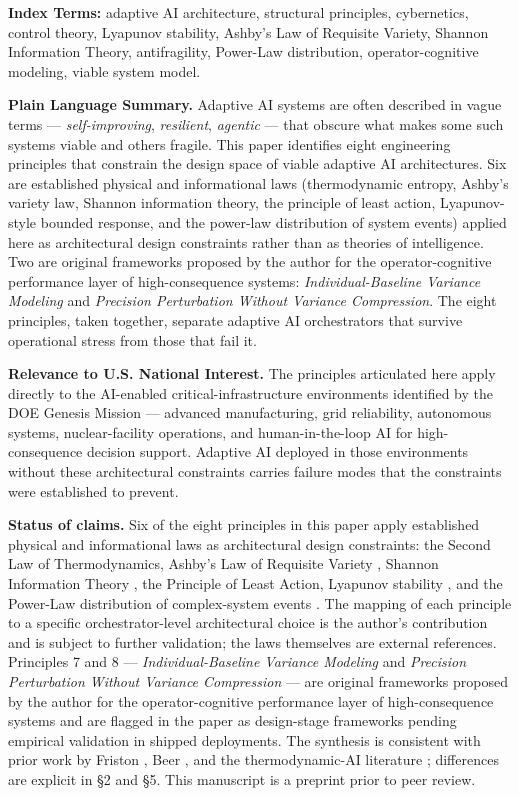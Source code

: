 \textbf{Index Terms:} adaptive AI architecture, structural principles,
cybernetics, control theory, Lyapunov stability, Ashby's Law of
Requisite Variety, Shannon Information Theory, antifragility, Power-Law
distribution, operator-cognitive modeling, viable system model.

\textbf{Plain Language Summary.} Adaptive AI systems are often described
in vague terms --- \emph{self-improving}, \emph{resilient},
\emph{agentic} --- that obscure what makes some such systems viable and
others fragile. This paper identifies eight engineering principles that
constrain the design space of viable adaptive AI architectures. Six are
established physical and informational laws (thermodynamic entropy,
Ashby's variety law, Shannon information theory, the principle of least
action, Lyapunov-style bounded response, and the power-law distribution
of system events) applied here as architectural design constraints
rather than as theories of intelligence. Two are original frameworks
proposed by the author for the operator-cognitive performance layer of
high-consequence systems: \emph{Individual-Baseline Variance Modeling}
and \emph{Precision Perturbation Without Variance Compression}. The
eight principles, taken together, separate adaptive AI orchestrators
that survive operational stress from those that fail it.

\textbf{Relevance to U.S. National Interest.} The principles articulated
here apply directly to the AI-enabled critical-infrastructure
environments identified by the DOE Genesis Mission --- advanced
manufacturing, grid reliability, autonomous systems, nuclear-facility
operations, and human-in-the-loop AI for high-consequence decision
support. Adaptive AI deployed in those environments without these
architectural constraints carries failure modes that the constraints
were established to prevent.

\textbf{Status of claims.} Six of the eight principles in this paper
apply established physical and informational laws as architectural
design constraints: the Second Law of Thermodynamics, Ashby's Law of
Requisite Variety \cite{ref6}, Shannon Information Theory \cite{ref7}, the
Principle of Least Action, Lyapunov stability \cite{ref8}, and the Power-Law
distribution of complex-system events \cite{ref9}. The mapping of each
principle to a specific orchestrator-level architectural choice is the
author's contribution and is subject to further validation; the laws
themselves are external references. Principles 7 and 8 ---
\emph{Individual-Baseline Variance Modeling} and \emph{Precision
Perturbation Without Variance Compression} --- are original frameworks
proposed by the author for the operator-cognitive performance layer of
high-consequence systems and are flagged in the paper as design-stage
frameworks pending empirical validation in shipped deployments. The
synthesis is consistent with prior work by Friston \cite{ref3}, Beer
\cite{ref4}, and the thermodynamic-AI literature \cite{ref5}; differences are
explicit in §2 and §5. This manuscript is a preprint prior to peer
review.

